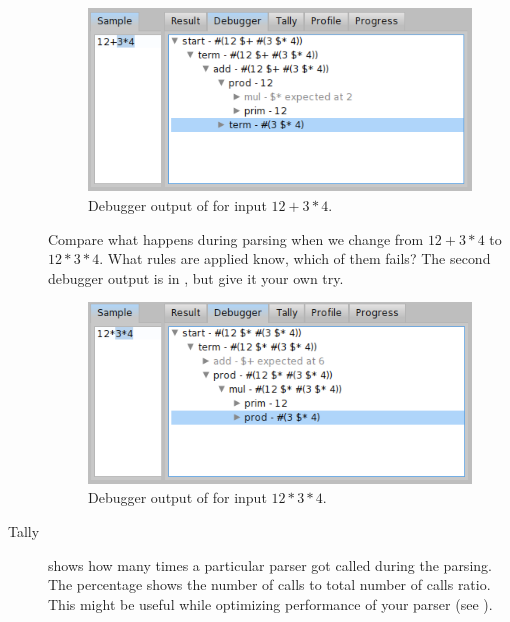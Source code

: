 \documentclass[a4paper,10pt,twoside]{book}
\begin{document}
\begin{description}
\begin{figure}[ht]
  \begin{center}
    \includegraphics[width=.8\linewidth]{PPBrowserDebugger3}
    \caption{Debugger output of  for input $12+3*4$. \label{fig:pp/debugger}}
  \end{center}
\end{figure}

  Compare what happens during parsing when we change from $12 + 3 * 4$ to $12 * 3 * 4$.
  What rules are applied know, which of them fails?
  The second debugger output is in , but give it your own try.

\begin{figure}[ht]
  \begin{center}
    \includegraphics[width=.8\linewidth]{PPBrowserDebugger4}
    \caption{Debugger output of  for input $12*3*4$. \label{fig:pp/debugger2}}
  \end{center}
\end{figure}

\item[Tally] shows how many times a particular parser got called
  during the parsing. The percentage shows the number of calls to total number
  of calls ratio. This might be useful while optimizing performance of
  your parser (see ).
    

\end{description}
\end{document}
